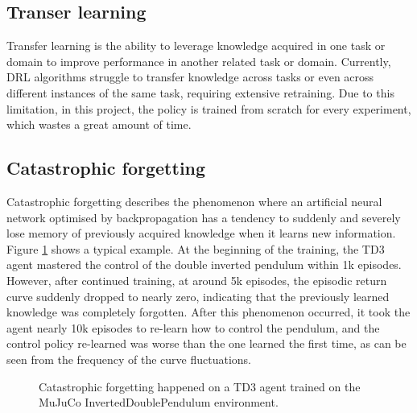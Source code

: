 \subsection{Transer learning}

Transfer learning is the ability to leverage knowledge acquired in one task or domain to improve performance in another related task or domain. Currently, DRL algorithms struggle to transfer knowledge across tasks or even across different instances of the same task, requiring extensive retraining. Due to this limitation, in this project, the policy is trained from scratch for every experiment, which wastes a great amount of time.

\subsection{Catastrophic forgetting}

Catastrophic forgetting describes the phenomenon where an artificial neural network optimised by backpropagation has a tendency to suddenly and severely lose memory of previously acquired knowledge when it learns new information. Figure \ref{fig:catastrophic-forgetting} shows a typical example. At the beginning of the training, the TD3 agent mastered the control of the double inverted pendulum within 1k episodes. However, after continued training, at around 5k episodes, the episodic return curve suddenly dropped to nearly zero, indicating that the previously learned knowledge was completely forgotten. After this phenomenon occurred, it took the agent nearly 10k episodes to re-learn how to control the pendulum, and the control policy re-learned was worse than the one learned the first time, as can be seen from the frequency of the curve fluctuations.

\begin{figure}[htbp]
   \centering
   
   \caption{Catastrophic forgetting happened on a TD3 agent trained on the MuJuCo InvertedDoublePendulum environment.}
   \label{fig:catastrophic-forgetting}
\end{figure}
